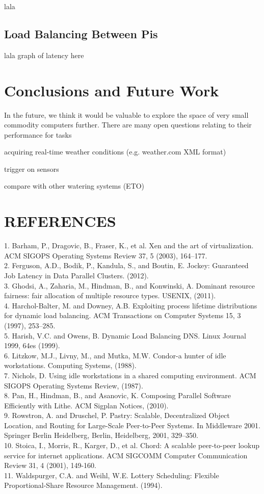 \documentclass[a4paper]{acm_proc_article-sp}
\begin{document}
lala

\subsection{Load Balancing Between Pis}

lala
graph of latency here

\section{Conclusions and Future Work}

In the future, we think it would be valuable to explore the space of very small commodity computers further.  There are many open questions relating to their performance for tasks

acquiring real-time weather conditions (e.g. weather.com XML format)

trigger on sensors

compare with other watering systems (ETO)

\section{REFERENCES}

1.	Barham, P., Dragovic, B., Fraser, K., et al. Xen and the art of virtualization. ACM SIGOPS Operating Systems Review 37, 5 (2003), 164–177.\\
2.	Ferguson, A.D., Bodik, P., Kandula, S., and Boutin, E. Jockey: Guaranteed Job Latency in Data Parallel Clusters. (2012).\\
3.	Ghodsi, A., Zaharia, M., Hindman, B., and Konwinski, A. Dominant resource fairness: fair allocation of multiple resource types. USENIX, (2011).\\
4.	Harchol-Balter, M. and Downey, A.B. Exploiting process lifetime distributions for dynamic load balancing. ACM Transactions on Computer Systems 15, 3 (1997), 253–285.\\
5.	Harish, V.C. and Owens, B. Dynamic Load Balancing DNS. Linux Journal 1999, 64es (1999).\\
6.	Litzkow, M.J., Livny, M., and Mutka, M.W. Condor-a hunter of idle workstations. Computing Systems, (1988).\\
7.	Nichols, D. Using idle workstations in a shared computing environment. ACM SIGOPS Operating Systems Review, (1987).\\
8.	Pan, H., Hindman, B., and Asanovic, K. Composing Parallel Software Efficiently with Lithe. ACM Sigplan Notices, (2010).\\
9.	Rowstron, A. and Druschel, P. Pastry: Scalable, Decentralized Object Location, and Routing for Large-Scale Peer-to-Peer Systems. In Middleware 2001. Springer Berlin Heidelberg, Berlin, Heidelberg, 2001, 329–350.\\
10.	Stoica, I., Morris, R., Karger, D., et al. Chord: A scalable peer-to-peer lookup service for internet applications. ACM SIGCOMM Computer Communication Review 31, 4 (2001), 149-160.\\
11.	Waldspurger, C.A. and Weihl, W.E. Lottery Scheduling: Flexible Proportional-Share Resource Management. (1994).



\end{document}
